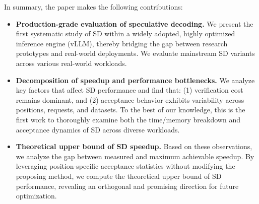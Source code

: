 In summary, the paper makes the following contributions:
\begin{itemize}[leftmargin=*, itemsep=2pt]
    \item \textbf{Production-grade evaluation of speculative decoding.} 
    We present the first systematic study of SD within a widely adopted, highly optimized inference engine (vLLM), thereby bridging the gap between research prototypes and real-world deployments. We evaluate mainstream SD variants across various real-world workloads.

    \item \textbf{Decomposition of speedup and performance bottlenecks.} 
    We analyze key factors that affect SD performance and find that: (1) verification cost remains dominant, and (2) acceptance behavior exhibits variability across positions, requests, and datasets. To the best of our knowledge, this is the first work to thoroughly examine both the time/memory breakdown and acceptance dynamics of SD across diverse workloads.

    \item \textbf{Theoretical upper bound of SD speedup.} 
    Based on these observations, we analyze the gap between measured and maximum achievable speedup. By leveraging position-specific acceptance statistics without modifying the proposing method, we compute the theoretical upper bound of SD performance, revealing an orthogonal and promising direction for future optimization.
\end{itemize}














